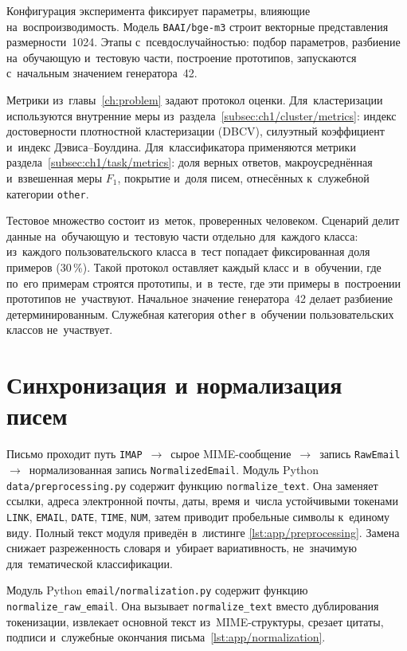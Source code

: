 Конфигурация эксперимента фиксирует параметры, влияющие на~воспроизводимость.
Модель \texttt{BAAI/bge-m3} строит векторные представления размерности~1024.
Этапы с~псевдослучайностью: подбор параметров, разбиение на~обучающую
и~тестовую части, построение прототипов, запускаются с~начальным значением
генератора~42.

Метрики из~главы~\ref{ch:problem} задают протокол оценки. Для~кластеризации
используются внутренние меры из~раздела~\ref{subsec:ch1/cluster/metrics}: индекс
достоверности плотностной кластеризации (DBCV), силуэтный коэффициент и~индекс
Дэвиса--Боулдина. Для~классификатора применяются метрики
раздела~\ref{subsec:ch1/task/metrics}: доля верных ответов,
макроусреднённая и~взвешенная меры \( F_1 \), покрытие и~доля писем,
отнесённых к~служебной категории \texttt{other}.

Тестовое множество состоит из~меток, проверенных человеком. Сценарий
делит данные на~обучающую и~тестовую части отдельно для~каждого класса:
из~каждого пользовательского класса в~тест попадает фиксированная доля примеров
(30\,\%). Такой протокол оставляет каждый класс и~в~обучении, где по~его
примерам строятся прототипы, и~в~тесте, где эти примеры в~построении прототипов
не~участвуют. Начальное значение генератора~42 делает разбиение
детерминированным. Служебная категория \texttt{other} в~обучении
пользовательских классов не~участвует.

\section{Синхронизация и нормализация писем}\label{sec:ch3/norm}

Письмо проходит путь \texttt{IMAP}~\(\to\)~сырое MIME-сообщение~\(\to\)~запись
\texttt{RawEmail}~\(\to\)~нормализованная запись \texttt{NormalizedEmail}.
Модуль Python \texttt{data/preprocessing.py} содержит функцию
\texttt{normalize\_text}. Она заменяет ссылки, адреса электронной почты, даты,
время и~числа устойчивыми токенами \texttt{LINK}, \texttt{EMAIL},
\texttt{DATE}, \texttt{TIME}, \texttt{NUM}, затем приводит пробельные символы
к~единому виду. Полный текст модуля приведён в~листинге
\ref{lst:app/preprocessing}. Замена снижает разреженность словаря и~убирает
вариативность, не~значимую для~тематической классификации.

Модуль Python \texttt{email/normalization.py} содержит функцию
\texttt{normalize\_raw\_email}. Она вызывает \texttt{normalize\_text} вместо
дублирования токенизации, извлекает основной текст из~MIME-структуры, срезает
цитаты, подписи и~служебные окончания письма~\ref{lst:app/normalization}.

